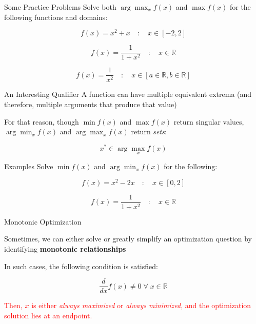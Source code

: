 \documentclass[10pt]{beamer}
\begin{document}
\begin{frame}{Some Practice Problems}
    Solve both $\arg\max_x f(x)$ and $\max f(x)$ for the following functions and domains:

    \[f(x) = x^2 + x \quad :\quad  x \in [-2,2]\]

    \[f(x) = \frac{1}{1 + x^2} \quad : \quad x \in \mathbb{R}\]

     \[f(x) = \frac{1}{x^2} \quad : \quad x \in [a\in \mathbb{R},b \in \mathbb{R}]\]
\end{frame}

\begin{frame}{An Interesting Qualifier}
    A function can have multiple equivalent extrema (and therefore, multiple arguments that produce that value) \\

    \vspace{1cm}

    For that reason, though $\min f(x)$ and $\max f(x)$ return singular values, $\arg\min_x f(x)$ and $\arg\max_x f(x)$ return \textit{sets}:

    \[x^* \in \arg\max_x f(x)\]

    
\end{frame}

\begin{frame}{Examples}
    Solve $\min f(x)$ and $\arg\min_x f(x)$ for the following:

    \[f(x) = x^2 - 2x \quad : \quad x \in [0,2]\]

    \[f(x) = \frac{1}{1+x^2} \quad : \quad x \in \mathbb{R}\]
\end{frame}

\begin{frame}{Monotonic Optimization}

Sometimes, we can either solve or greatly simplify an optimization question by identifying \textbf{monotonic relationships} \\

\vspace{1cm}

In such cases, the following condition is satisfied:

\[\frac{d}{dx} f(x) \neq 0 \;\forall\; x \in \mathbb{R}\]

\textcolor{red}{Then, $x$ is either \textit{always maximized} or \textit{always minimized}, and the optimization solution lies at an endpoint.}
    
\end{frame}
\end{document}
